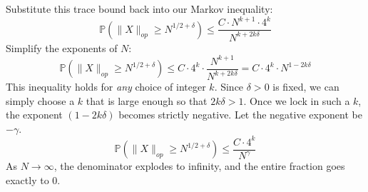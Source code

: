\begin{solution}
Substitute this trace bound back into our Markov inequality:
\[ \mathbb{P}(\|X\|_{op} \geq N^{1/2+\delta}) \leq \frac{C \cdot N^{k+1} \cdot 4^k}{N^{k+2k\delta}} \]
Simplify the exponents of $N$:
\[ \mathbb{P}(\|X\|_{op} \geq N^{1/2+\delta}) \leq C \cdot 4^k \cdot \frac{N^{k+1}}{N^{k+2k\delta}} = C \cdot 4^k \cdot N^{1 - 2k\delta} \]
This inequality holds for \textit{any} choice of integer $k$. Since $\delta > 0$ is fixed, we can simply choose a $k$ that is large enough so that $2k\delta > 1$.
Once we lock in such a $k$, the exponent $(1 - 2k\delta)$ becomes strictly negative.
Let the negative exponent be $-\gamma$.
\[ \mathbb{P}(\|X\|_{op} \geq N^{1/2+\delta}) \leq \frac{C \cdot 4^k}{N^\gamma} \]
As $N \to \infty$, the denominator explodes to infinity, and the entire fraction goes exactly to 0.
\end{solution}

